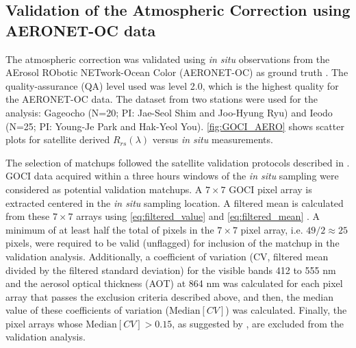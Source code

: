\documentclass[onecolumn,3p,letterpaper,11pt]{elsarticle}
\begin{document}
\subsection{Validation of the Atmospheric Correction using AERONET-OC data}
The atmospheric correction was validated using {\it in situ} observations from the AErosol RObotic NETwork-Ocean Color (AERONET-OC) as ground truth \citep{Zibordi2009}. The quality-assurance (QA) level used was level 2.0, which is the highest quality for the AERONET-OC data. The dataset from two stations were used for the analysis: Gageocho (N=20; PI: Jae-Seol Shim and Joo-Hyung Ryu) and Ieodo (N=25; PI: Young-Je Park and Hak-Yeol You). \autoref{fig:GOCI_AERO} shows scatter plots for satellite derived $R_{rs}(\lambda)$ versus {\it in situ} measurements. 

The selection of matchups followed the satellite validation protocols described in \citet{Bailey2006}. GOCI data acquired within a three hours windows of the {\it in situ} sampling were considered as potential validation matchups. A $7\times7$ GOCI pixel array is extracted centered in the {\it in situ} sampling location.
A filtered mean is calculated from these $7\times7$ arrays using \autoref{eq:filtered_value} and \autoref{eq:filtered_mean} \citep{Bailey2006}. A minimum of at least half the total of pixels in the $7\times7$ pixel array, i.e. $49/2\approx25$ pixels, were required to be valid (unflagged) for inclusion of the matchup in the validation analysis. Additionally, a coefficient of variation (CV, filtered mean divided by the filtered standard deviation) for the visible bands 412 to 555 nm and the aerosol optical thickness (AOT) at 864 nm was calculated for each pixel array that passes the exclusion criteria described above, and then, the median value of these coefficients of variation ($\text{Median}[CV]$) was calculated. Finally, the pixel arrays whose $\text{Median}[CV]>0.15$, as suggested by \citep{Bailey2006}, are excluded from the validation analysis.
\end{document}
